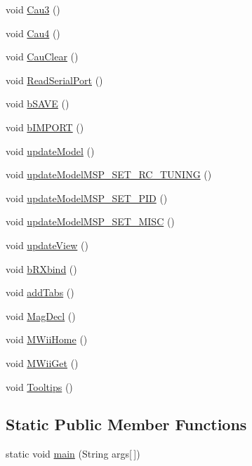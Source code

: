 \begin{DoxyCompactItemize}
\item 
void \hyperlink{classMultiWiiConf_a390839149da4f3010a44ae9198224d82}{Cau3} ()
\item 
void \hyperlink{classMultiWiiConf_a52188c481473e6840c32819a1bb59b87}{Cau4} ()
\item 
void \hyperlink{classMultiWiiConf_a4f7d659bc40a7a1d3ea1578302f85897}{Cau\-Clear} ()
\item 
void \hyperlink{classMultiWiiConf_acdf30272639726614b0b6c817a61d791}{Read\-Serial\-Port} ()
\item 
void \hyperlink{classMultiWiiConf_a1fce4aba9f4303d1859ed3122f6d6cf5}{b\-S\-A\-V\-E} ()
\item 
void \hyperlink{classMultiWiiConf_a6cdbed88e5d94db4ee58b70f299f5dc0}{b\-I\-M\-P\-O\-R\-T} ()
\item 
void \hyperlink{classMultiWiiConf_ae152c1f5d8b20485ff92a20b8d15f9fb}{update\-Model} ()
\item 
void \hyperlink{classMultiWiiConf_a02f7cd92c516edf9ba014433209c5e66}{update\-Model\-M\-S\-P\-\_\-\-S\-E\-T\-\_\-\-R\-C\-\_\-\-T\-U\-N\-I\-N\-G} ()
\item 
void \hyperlink{classMultiWiiConf_a757bd807090b63a8142667d090b41542}{update\-Model\-M\-S\-P\-\_\-\-S\-E\-T\-\_\-\-P\-I\-D} ()
\item 
void \hyperlink{classMultiWiiConf_a57633ac74ed66b9f52afe79aec9d6f56}{update\-Model\-M\-S\-P\-\_\-\-S\-E\-T\-\_\-\-M\-I\-S\-C} ()
\item 
void \hyperlink{classMultiWiiConf_ac88fe7ed959b47cf8519b35ef8c77c05}{update\-View} ()
\item 
void \hyperlink{classMultiWiiConf_a6325b24efa261211d04156d1c05cfcca}{b\-R\-Xbind} ()
\item 
void \hyperlink{classMultiWiiConf_a5eb513429b08b77f4cb2f656bcaced6f}{add\-Tabs} ()
\item 
void \hyperlink{classMultiWiiConf_a6bc6be0898feb09f6693b7e3b7d3f6fe}{Mag\-Decl} ()
\item 
void \hyperlink{classMultiWiiConf_a9c993ed28846ae789acdbdb93f8f17d7}{M\-Wii\-Home} ()
\item 
void \hyperlink{classMultiWiiConf_a6523326eff761ad689372a4373065e2b}{M\-Wii\-Get} ()
\item 
void \hyperlink{classMultiWiiConf_ace168f10f8c5bf01bc3739f5f218b6e9}{Tooltips} ()
\end{DoxyCompactItemize}
\subsection*{Static Public Member Functions}
\begin{DoxyCompactItemize}
\item 
static void \hyperlink{classMultiWiiConf_a844c042472c9c11dbd805cf36ccebafd}{main} (String args\mbox{[}$\,$\mbox{]})
\end{DoxyCompactItemize}
